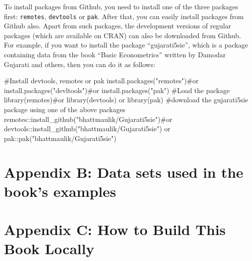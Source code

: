 \documentclass[
  letterpaper,
  paper =a4,
  twoside,
  openright,
  headsepline,
  footsepline,
  listof = totocnumbered,
  chapterprefix = true,
  firstiscover]{scrbook}
\newenvironment{Shaded}{\begin{snugshade}}{\end{snugshade}}
\newcommand{\CommentTok}[1]{\textcolor[rgb]{0.37,0.37,0.37}{#1}}
\newcommand{\FunctionTok}[1]{\textcolor[rgb]{0.28,0.35,0.67}{#1}}
\newcommand{\NormalTok}[1]{\textcolor[rgb]{0.00,0.23,0.31}{#1}}
\newcommand{\SpecialCharTok}[1]{\textcolor[rgb]{0.37,0.37,0.37}{#1}}
\newcommand{\StringTok}[1]{\textcolor[rgb]{0.13,0.47,0.30}{#1}}
\begin{document}
To install packages from Github, you need to install one of the three
packages first: \texttt{remotes}, \texttt{devtools} or \texttt{pak}.
After that, you can easily install packages from Github also. Apart from
such packages, the development versions of regular packages (which are
available on CRAN) can also be downloaded from Github. For example, if
you want to install the package ``gujarati5sie'', which is a package
containing data from the book ``Basic Econometrics'' written by Damodar
Gujarati and others, then you can do it as follows:

\begin{Shaded}
\begin{Highlighting}[numbers=left,,]
\CommentTok{\#Install devtools, remotes or pak}
\FunctionTok{install.packages}\NormalTok{(}\StringTok{"remotes"}\NormalTok{)}\CommentTok{\#or install.packages("devltools")\#or install.packages("pak")}
\CommentTok{\#Load the package}
\FunctionTok{library}\NormalTok{(remotes)}\CommentTok{\#or library(devtools) or library(pak)}
\CommentTok{\#download the gujarati5sie package using one of the above packages}
\NormalTok{remotes}\SpecialCharTok{::}\FunctionTok{install\_github}\NormalTok{(}\StringTok{"bhattmaulik/Gujarati5sie"}\NormalTok{)}\CommentTok{\#or devtools::install\_github("bhattmaulik/Gujarati5sie") or pak::pak("bhattmaulik/Gujarati5sie")}
\end{Highlighting}
\end{Shaded}

\hypertarget{appendix-b-data-sets-used-in-the-books-examples}{%
\chapter*{Appendix B: Data sets used in the book's
examples}\label{appendix-b-data-sets-used-in-the-books-examples}}


\setcounter{figure}{0}
\renewcommand{\thefigure}{B.\arabic{figure}} 
\setcounter{table}{0}
\renewcommand{\thetable}{B.\arabic{table}}

\hypertarget{appendix-c-how-to-build-this-book-locally}{%
\chapter*{Appendix C: How to Build This Book
Locally}\label{appendix-c-how-to-build-this-book-locally}}
\end{document}
